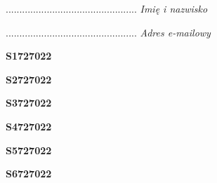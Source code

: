 \begin{turn}{90}\begin{minipage}{\linewidth} \vspace{20mm} ................................................  \textit{Imię i nazwisko}\end{minipage}\end{turn}

\begin{turn}{90}\begin{minipage}{\linewidth} \vspace{20mm} ................................................  \textit{Adres e-mailowy}\end{minipage}\end{turn}

\begin{turn}{90}\huge \begin{minipage}{\linewidth} \vspace{10mm}\textbf{S1727022}\end{minipage}\end{turn}

\begin{turn}{90}\huge \begin{minipage}{\linewidth} \vspace{10mm}\textbf{S2727022}\end{minipage}\end{turn}

\begin{turn}{90}\huge \begin{minipage}{\linewidth} \vspace{10mm}\textbf{S3727022}\end{minipage}\end{turn}

\begin{turn}{90}\huge \begin{minipage}{\linewidth} \vspace{10mm}\textbf{S4727022}\end{minipage}\end{turn}

\begin{turn}{90}\huge \begin{minipage}{\linewidth} \vspace{10mm}\textbf{S5727022}\end{minipage}\end{turn}

\begin{turn}{90}\huge \begin{minipage}{\linewidth} \vspace{10mm}\textbf{S6727022}\end{minipage}\end{turn}


